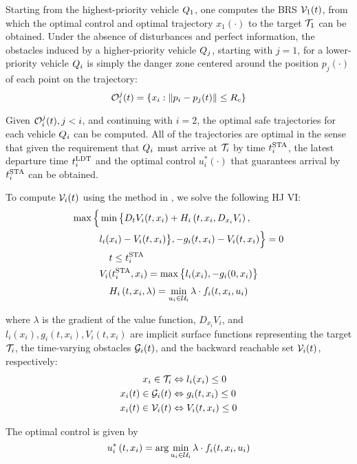 Starting from the highest-priority vehicle $Q_1$, one computes the BRS $\mathcal{V}_1(t)$, from which the optimal control and optimal trajectory $x_1(\cdot)$ to the target $\mathcal{T}_1$ can be obtained. Under the absence of disturbances and perfect information, the obstacles induced by a higher-priority vehicle $Q_j$, starting with $j=1$, for a lower-priority vehicle $Q_i$ is simply the danger zone centered around the position $p_j(\cdot)$ of each point on the trajectory:
\vspace{-0.5em} 
\begin{equation}
\mathcal{O}_i^j(t) = \{x_i: \|p_i - p_j(t)\|\le R_c\}
\end{equation}

Given $\mathcal{O}_i^j(t), j<i$, and continuing with $i = 2$, the optimal safe trajectories for each vehicle $Q_i$ can be computed. All of the trajectories are optimal in the sense that given the requirement that $Q_i$ must arrive at $\mathcal{T}_i$ by time $t^\text{STA}_i$, the latest departure time $t^\text{LDT}_i$ and the optimal control $u^*_i(\cdot)$ that guarantees arrival by $t^\text{STA}_i$ can be obtained.

To compute $\mathcal{V}_i(t)$ using the method in \cite{Fisac15}, we solve the following HJ VI:
\vspace{-0.5em} 
\begin{equation}
\label{eq:HJIVI}
\begin{aligned}
\max\Big\{&\min\big\{D_t V_i(t, x_i) + H_i\left(t, x_i, D_{x_i} V_i\right), \\
&l_i(x_i) - V_i(t, x_i)\big\}, -g_i(t, x_i) - V_i(t, x_i)\Big\} = 0 \\
&\quad t\le t^\text{STA}_i\\
&V_i(t^\text{STA}_i, x_i) = \max\big\{l_i(x_i), -g_i(0, x_i)\big\}\\ 
\end{aligned}
\end{equation}
\begin{equation}
\label{eq:basicSPPHam}
H_i\left(t, x_i, \lambda\right) = \min_{u_i \in \mathcal{U}_i} \lambda \cdot f_i(t, x_i, u_i)
\end{equation}

\noindent where $\lambda$ is the gradient of the value function, $D_{x_i} V_i$, and $l_i(x_i), g_i(t,x_i),V_i(t,x_i)$ are implicit surface functions representing the target $\mathcal{T}_i$, the time-varying obstacles $\mathcal{G}_i(t)$, and the backward reachable set $\mathcal{V}_i(t)$, respectively: 
\begin{equation}
\label{eq:impl_surf}
\begin{aligned}
x_i \in \mathcal{T}_i &\Leftrightarrow l_i(x_i) \le 0 \\
x_i(t) \in \mathcal{G}_i(t) &\Leftrightarrow g_i(t,x_i) \le 0 \\
x_i(t) \in \mathcal{V}_i(t) &\Leftrightarrow V_i(t, x_i) \le 0
\end{aligned}
\end{equation}

The optimal control is given by
 \vspace{-0.4em} 
\begin{equation}
\label{eq:optCtrl}
u^*_i\left(t, x_i\right) = \arg \min_{u_i \in \mathcal{U}_i} \lambda \cdot f_i(t, x_i, u_i)
\end{equation}
